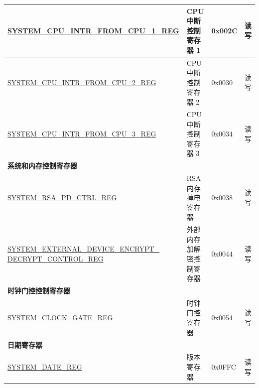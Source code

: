 \begin{longtable}{ | p{6.5cm} | p{5.5cm} | p{1.3cm} | p{2cm} | }
\hyperref[regdesc:SYSTEMCPUINTRFROMCPU1REG]{SYSTEM\_CPU\_INTR\_FROM\_CPU\_1\_REG} & CPU 中断控制寄存器 1 & 0x002C & 读写 \\ \hline
\hyperref[regdesc:SYSTEMCPUINTRFROMCPU2REG]{SYSTEM\_CPU\_INTR\_FROM\_CPU\_2\_REG} & CPU 中断控制寄存器 2 & 0x0030 & 读写 \\ \hline
\hyperref[regdesc:SYSTEMCPUINTRFROMCPU3REG]{SYSTEM\_CPU\_INTR\_FROM\_CPU\_3\_REG} & CPU 中断控制寄存器 3 & 0x0034 & 读写 \\ \hline
\multicolumn{4}{|l|}{\textbf{系统和内存控制寄存器}} \\ \hline
\hyperref[regdesc:SYSTEMRSAPDCTRLREG]{SYSTEM\_RSA\_PD\_CTRL\_REG} & RSA 内存掉电寄存器 & 0x0038 & 读写 \\ \hline
\hyperref[regdesc:SYSTEMEXTERNALDEVICEENCRYPTDECRYPTCONTROLREG]{SYSTEM\_EXTERNAL\_DEVICE\_ENCRYPT\_} \hyperref[regdesc:SYSTEMEXTERNALDEVICEENCRYPTDECRYPTCONTROLREG]{DECRYPT\_CONTROL\_REG} & 外部内存加解密控制寄存器 & 0x0044 & 读写 \\ \hline
\multicolumn{4}{|l|}{\textbf{时钟门控控制寄存器}} \\ \hline
\hyperref[regdesc:SYSTEMCLOCKGATEREG]{SYSTEM\_CLOCK\_GATE\_REG} & 时钟门控寄存器 & 0x0054 & 读写 \\ \hline
\multicolumn{4}{|l|}{\textbf{日期寄存器}} \\ \hline
\hyperref[regdesc:SYSTEMDATEREG]{SYSTEM\_DATE\_REG} & 版本寄存器 & 0x0FFC & 读写 \\ \hline
\end{longtable}
